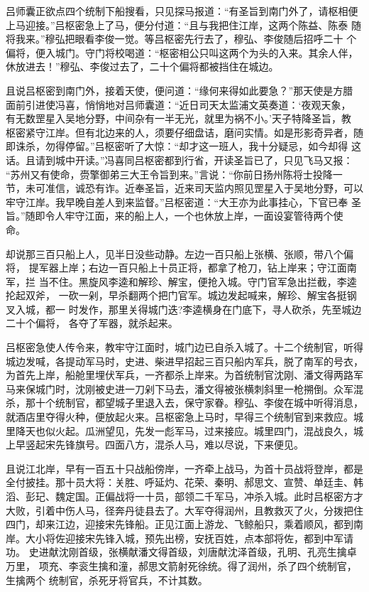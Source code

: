吕师囊正欲点四个统制下船搜看，只见探马报道：“有圣旨到南门外了，请枢相便
上马迎接。”吕枢密急上了马，便分付道：“且与我把住江岸，这两个陈益、陈泰
随将我来。”穆弘把眼看李俊一觉。等吕枢密先行去了，穆弘、李俊随后招呼二十
个偏将，便入城门。守门将校喝道：“枢密相公只叫这两个为头的入来。其余人伴，
休放进去！”穆弘、李俊过去了，二十个偏将都被挡住在城边。

且说吕枢密到南门外，接着天使，便问道：“缘何来得如此要急？”那天使是方腊
面前引进使冯喜，悄悄地对吕师囊道：“近日司天太监浦文英奏道：‘夜观天象，
有无数罡星入吴地分野，中间杂有一半无光，就里为祸不小。’天子特降圣旨，教
枢密紧守江岸。但有北边来的人，须要仔细盘诘，磨问实情。如是形影奇异者，随
即诛杀，勿得停留。”吕枢密听了大惊：“却才这一班人，我十分疑忌，如今却得
这话。且请到城中开读。”冯喜同吕枢密都到行省，开读圣旨已了，只见飞马又报：
“苏州又有使命，赍擎御弟三大王令旨到来。”言说：“你前日扬州陈将士投降一
节，未可准信，诚恐有诈。近奉圣旨，近来司天监内照见罡星入于吴地分野，可以
牢守江岸。我早晚自差人到来监督。”吕枢密道：“大王亦为此事挂心，下官已奉
圣旨。”随即令人牢守江面，来的船上人，一个也休放上岸，一面设宴管待两个使
命。

却说那三百只船上人，见半日没些动静。左边一百只船上张横、张顺，带八个偏将，
提军器上岸；右边一百只船上十员正将，都拿了枪刀，钻上岸来；守江面南军，拦
当不住。黑旋风李逵和解珍、解宝，便抢入城。守门官军急出拦截，李逵抡起双斧，
一砍一剁，早杀翻两个把门官军。城边发起喊来，解珍、解宝各挺钢叉入城，都一
时发作，那里关得城门迭?李逵横身在门底下，寻人砍杀，先至城边二十个偏将，
各夺了军器，就杀起来。

吕枢密急使人传令来，教牢守江面时，城门边已自杀入城了。十二个统制官，听得
城边发喊，各提动军马时，史进、柴进早招起三百只船内军兵，脱了南军的号衣，
为首先上岸，船舱里埋伏军兵，一齐都杀上岸来。为首统制官沈刚、潘文得两路军
马来保城门时，沈刚被史进一刀剁下马去，潘文得被张横刺斜里一枪搠倒。众军混
杀，那十个统制官，都望城子里退入去，保守家眷。穆弘、李俊在城中听得消息，
就酒店里夺得火种，便放起火来。吕枢密急上马时，早得三个统制官到来救应。城
里降天也似火起。瓜洲望见，先发一彪军马，过来接应。城里四门，混战良久，城
上早竖起宋先锋旗号。四面八方，混杀人马，难以尽说，下来便见。

且说江北岸，早有一百五十只战船傍岸，一齐牵上战马，为首十员战将登岸，都是
全付披挂。那十员大将：关胜、呼延灼、花荣、秦明、郝思文、宣赞、单廷圭、韩
滔、彭玘、魏定国。正偏战将一十员，部领二千军马，冲杀入城。此时吕枢密方才
大败，引着中伤人马，径奔丹徒县去了。大军夺得润州，且教救灭了火，分拨把住
四门，却来江边，迎接宋先锋船。正见江面上游龙、飞鲸船只，乘着顺风，都到南
岸。大小将佐迎接宋先锋入城，预先出榜，安抚百姓，点本部将佐，都到中军请功。
史进献沈刚首级，张横献潘文得首级，刘唐献沈泽首级，孔明、孔亮生擒卓万里，
项充、李衮生擒和潼，郝思文箭射死徐统。得了润州，杀了四个统制官，生擒两个
统制官，杀死牙将官兵，不计其数。

